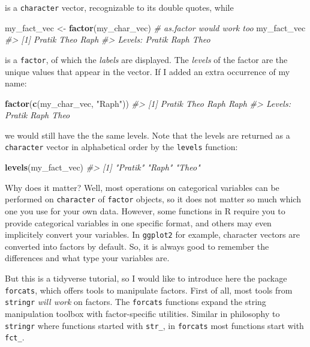 \documentclass[]{book}
\newenvironment{Shaded}{}{}
\newcommand{\CommentTok}[1]{\textcolor[rgb]{0.38,0.63,0.69}{\textit{#1}}}
\newcommand{\KeywordTok}[1]{\textcolor[rgb]{0.00,0.44,0.13}{\textbf{#1}}}
\newcommand{\NormalTok}[1]{#1}
\newcommand{\StringTok}[1]{\textcolor[rgb]{0.25,0.44,0.63}{#1}}
\begin{document}
is a \texttt{character} vector, recognizable to its double quotes, while

\begin{Shaded}
\begin{Highlighting}[]
\NormalTok{my_fact_vec <-}\StringTok{ }\KeywordTok{factor}\NormalTok{(my_char_vec) }\CommentTok{# as.factor would work too}
\NormalTok{my_fact_vec}
\CommentTok{#> [1] Pratik Theo   Raph  }
\CommentTok{#> Levels: Pratik Raph Theo}
\end{Highlighting}
\end{Shaded}

is a \texttt{factor}, of which the \emph{labels} are displayed. The \emph{levels} of the factor are the unique values that appear in the vector. If I added an extra occurrence of my name:

\begin{Shaded}
\begin{Highlighting}[]
\KeywordTok{factor}\NormalTok{(}\KeywordTok{c}\NormalTok{(my_char_vec, }\StringTok{"Raph"}\NormalTok{))}
\CommentTok{#> [1] Pratik Theo   Raph   Raph  }
\CommentTok{#> Levels: Pratik Raph Theo}
\end{Highlighting}
\end{Shaded}

we would still have the the same levels. Note that the levels are returned as a \texttt{character} vector in alphabetical order by the \texttt{levels} function:

\begin{Shaded}
\begin{Highlighting}[]
\KeywordTok{levels}\NormalTok{(my_fact_vec)}
\CommentTok{#> [1] "Pratik" "Raph"   "Theo"}
\end{Highlighting}
\end{Shaded}

Why does it matter? Well, most operations on categorical variables can be performed on \texttt{character} of \texttt{factor} objects, so it does not matter so much which one you use for your own data. However, some functions in R require you to provide categorical variables in one specific format, and others may even implicitely convert your variables. In \texttt{ggplot2} for example, character vectors are converted into factors by default. So, it is always good to remember the differences and what type your variables are.

But this is a tidyverse tutorial, so I would like to introduce here the package \texttt{forcats}, which offers tools to manipulate factors. First of all, most tools from \texttt{stringr} \emph{will work} on factors. The \texttt{forcats} functions expand the string manipulation toolbox with factor-specific utilities. Similar in philosophy to \texttt{stringr} where functions started with \texttt{str\_}, in \texttt{forcats} most functions start with \texttt{fct\_}.
\end{document}
